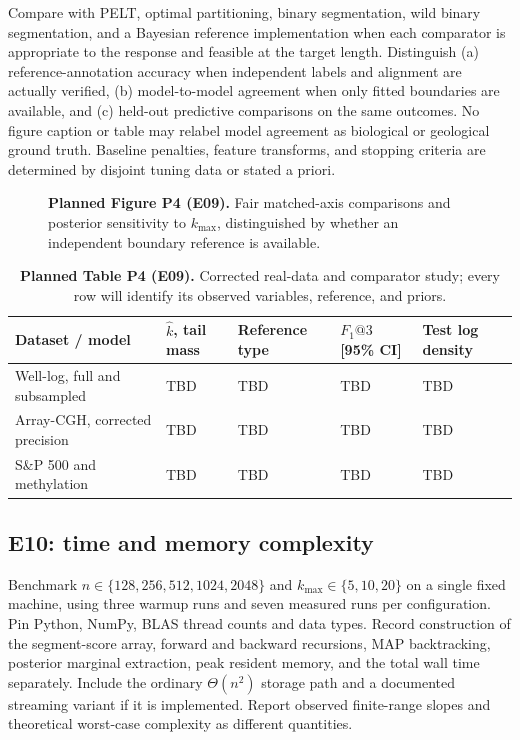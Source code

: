 Compare with PELT, optimal partitioning, binary segmentation, wild binary
segmentation, and a Bayesian reference implementation when each comparator is
appropriate to the response and feasible at the target length. Distinguish
(a) reference-annotation accuracy when independent labels and alignment are
actually verified, (b) model-to-model agreement when only fitted boundaries
are available, and (c) held-out predictive comparisons on the same outcomes.
No figure caption or table may relabel model agreement as biological or
geological ground truth. Baseline penalties, feature transforms, and stopping
criteria are determined by disjoint tuning data or stated a priori.

\begin{figure}[!htbp]
\centering
{}
\hfill
{}
\caption{\textbf{Planned Figure P4 (E09).} Fair matched-axis comparisons and
posterior sensitivity to $k_{\max}$, distinguished by whether an independent
boundary reference is available.}
\label{fig:planned-external-paper}
\end{figure}

\begin{table}[!htbp]
\centering\small
\caption{\textbf{Planned Table P4 (E09).} Corrected real-data and comparator
study; every row will identify its observed variables, reference, and priors.}
\label{tab:planned-external-paper}
\begin{tabularx}{0.94\textwidth}{@{}L{0.23\textwidth}L{0.17\textwidth}L{0.18\textwidth}L{0.19\textwidth}Y@{}}
\toprule
Dataset / model & $\widehat k$, tail mass & Reference type & $F_1@3$ [95\% CI] & Test log density \\
\midrule
Well-log, full and subsampled & TBD & TBD & TBD & TBD \\
Array-CGH, corrected precision & TBD & TBD & TBD & TBD \\
S\&P 500 and methylation & TBD & TBD & TBD & TBD \\
\bottomrule
\end{tabularx}
\end{table}

\subsection{E10: time and memory complexity}
Benchmark $n\in\{128,256,512,1024,2048\}$ and
$k_{\max}\in\{5,10,20\}$ on a single fixed machine, using three warmup
runs and seven measured runs per configuration. Pin Python, NumPy, BLAS
thread counts and data types. Record construction of the segment-score array,
forward and backward recursions, MAP backtracking, posterior marginal
extraction, peak resident memory, and the total wall time separately. Include
the ordinary $\Theta(n^2)$ storage path and a documented streaming variant if
it is implemented. Report observed finite-range slopes and theoretical
worst-case complexity as different quantities.

